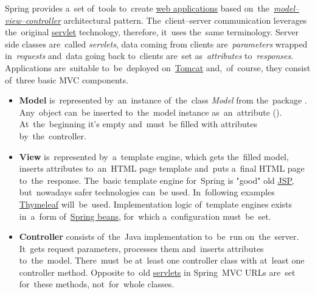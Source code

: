 Spring provides a~set of~tools to~create \hyperref[webserviceapplication]{web applications} based on~the~\hyperref[mvc]{\textit{model--view--controller}} architectural pattern.
The~client--server communication leverages the~original \hyperref[servlet]{servlet} technology, therefore, it~uses the~same terminology.
Server side classes are~called \textit{servlets}, data coming from clients are~\textit{parameters} wrapped in~\textit{requests} and~data going back to~clients are~set as~\textit{attributes} to~\textit{responses}.
Applications are~suitable to~be~deployed on~\hyperref[tomcat]{Tomcat} and,~of~course, they consist of~three basic MVC components.

\begin{itemize}
    \item \textbf{Model} is~represented by~an~instance of~the~class \textit{Model} from the~package . Any~object can~be inserted to~the~model instance as~an~attribute ().
          At~the~beginning it's empty and~must~be filled with attributes by~the~controller.
    \item \textbf{View} is~represented by~a~template engine, which gets the~filled model, inserts attributes to~an~HTML page template and~puts a~final HTML page to~the~response.
          The~basic template engine for~Spring is "good" old \hyperref[jsp]{JSP}, but~nowadays safer technologies can~be used.
          In~following examples \href{https://www.thymeleaf.org/}{Thymeleaf} will~be~used.
  Implementation logic of~template engines exists in~a~form of~\hyperref[springinversionofcontrol]{Spring beans}, for~which a~configuration must~be~set.
    \item \textbf{Controller} consists of~the~Java implementation to~be~run on~the~server.
          It~gets request parameters, processes them and~inserts attributes to~the~model.
          There~must~be at~least one controller class with at~least one controller method.
          Opposite to~old \hyperref[servlet]{servlets} in Spring~MVC URLs are~set for~these methods, not~for~whole classes.
\end{itemize}

